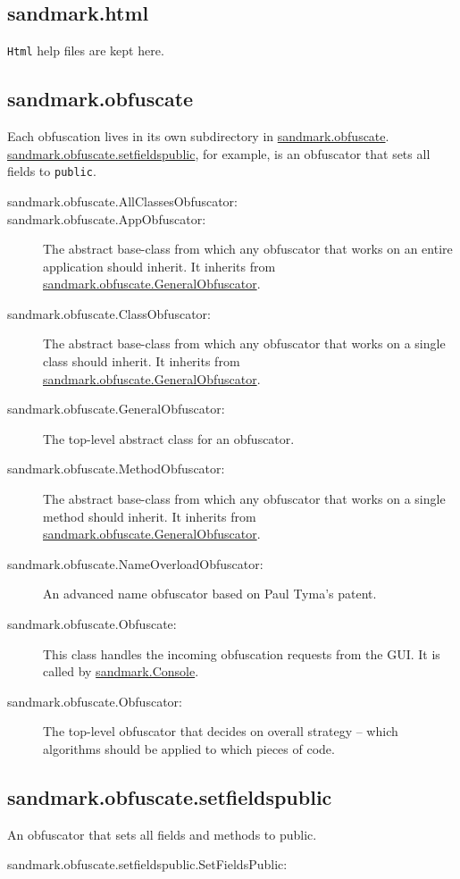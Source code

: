 \subsection{sandmark.html}
{\tt Html} help files are kept here.


\subsection{sandmark.obfuscate}
Each obfuscation lives in its own subdirectory
in \url{sandmark.obfuscate}. 
\url{sandmark.obfuscate.setfieldspublic}, for 
example, is an obfuscator that sets all fields 
to {\tt public}.
\begin{description}
   \item[sandmark.obfuscate.AllClassesObfuscator:]
   \item[sandmark.obfuscate.AppObfuscator:]
        The abstract base-class from which any obfuscator
        that works on an entire application should inherit.
        It inherits from \url{sandmark.obfuscate.GeneralObfuscator}.
   \item[sandmark.obfuscate.ClassObfuscator:]
        The abstract base-class from which any obfuscator
        that works on a single class should inherit.
        It inherits from \url{sandmark.obfuscate.GeneralObfuscator}.
   \item[sandmark.obfuscate.GeneralObfuscator:]
        The top-level abstract class for an obfuscator.
   \item[sandmark.obfuscate.MethodObfuscator:]
        The abstract base-class from which any obfuscator
        that works on a single method should inherit.
        It inherits from \url{sandmark.obfuscate.GeneralObfuscator}.
   \item[sandmark.obfuscate.NameOverloadObfuscator:]
        An advanced name obfuscator based on Paul Tyma's patent.
   \item[sandmark.obfuscate.Obfuscate:]
        This class handles the incoming obfuscation 
        requests from the GUI. It is called by \url{sandmark.Console}.
   \item[sandmark.obfuscate.Obfuscator:]
        The top-level obfuscator that decides on overall
        strategy -- which algorithms should be applied to
        which pieces of code.
\end{description}

\subsection{sandmark.obfuscate.setfieldspublic}
An obfuscator that sets all fields and methods to public.
\begin{description}
   \item[sandmark.obfuscate.setfieldspublic.SetFieldsPublic:]
\end{description}

